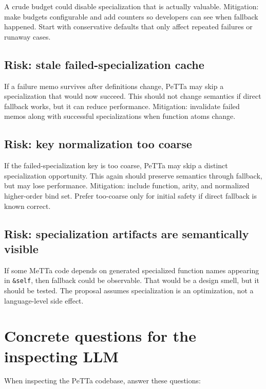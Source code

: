 \documentclass[11pt]{article}
\begin{document}
A crude budget could disable specialization that is actually valuable. Mitigation: make budgets configurable and add counters so developers can see when fallback happened. Start with conservative defaults that only affect repeated failures or runaway cases.

\subsection{Risk: stale failed-specialization cache}

If a failure memo survives after definitions change, PeTTa may skip a specialization that would now succeed. This should not change semantics if direct fallback works, but it can reduce performance. Mitigation: invalidate failed memos along with successful specializations when function atoms change.

\subsection{Risk: key normalization too coarse}

If the failed-specialization key is too coarse, PeTTa may skip a distinct specialization opportunity. This again should preserve semantics through fallback, but may lose performance. Mitigation: include function, arity, and normalized higher-order bind set. Prefer too-coarse only for initial safety if direct fallback is known correct.

\subsection{Risk: specialization artifacts are semantically visible}

If some MeTTa code depends on generated specialized function names appearing in \texttt{\&self}, then fallback could be observable. That would be a design smell, but it should be tested. The proposal assumes specialization is an optimization, not a language-level side effect.

\section{Concrete questions for the inspecting LLM}

When inspecting the PeTTa codebase, answer these questions:
\end{document}

